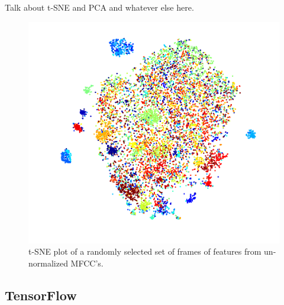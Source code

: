 \documentclass[a4paper,11pt,notitlepage]{article}
\begin{document}
Talk about t-SNE and PCA and whatever else here.

\begin{figure}[H]
	\centering
	\vspace{0.5cm}
	\includegraphics[scale = 0.5]{figs/tsne2.png}
	\caption{t-SNE plot of a randomly selected set of frames of features from un-normalized MFCC's.}
	\label{tsne1}
\end{figure}




\subsection{TensorFlow}\label{section:Tensorflow}

\end{document}

